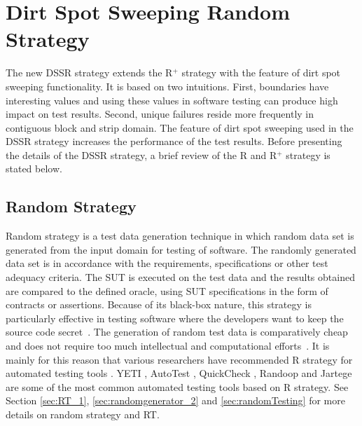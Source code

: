 
\section{Dirt Spot Sweeping Random Strategy}\label{sec:dssr}
The new DSSR strategy extends the R$^+$ strategy with the feature of dirt spot sweeping functionality. It is based on two intuitions. First, boundaries have interesting values and using these values in software testing can produce high impact on test results. Second, unique failures reside more frequently in contiguous block and strip domain. The feature of dirt spot sweeping used in the DSSR strategy increases the performance of the test results. Before presenting the details of the DSSR strategy, a brief review of the R and R$^+$ strategy is stated below.

\subsection{Random Strategy}
Random strategy is a test data generation technique in which random data set is generated from the input domain for testing of software. The randomly generated data set is in accordance with the requirements, specifications or other test adequacy criteria. The SUT is executed on the test data and the results obtained are compared to the defined oracle, using SUT specifications in the form of contracts or assertions. Because of its black-box nature, this strategy is particularly effective in testing software where the developers want to keep the source code secret~\cite{chen2010adaptive}. The generation of random test data is comparatively cheap and does not require too much intellectual and computational efforts~\cite{ciupa2008finding, ciupa2011number}. It is mainly for this reason that various researchers have recommended R strategy for automated testing tools \cite{ciupa2008artoo}.
 YETI \cite{oriol2010yeti}, AutoTest \cite{leitner2007reconciling, ciupa2007experimental}, QuickCheck \cite{claessen2011quickcheck}, Randoop \cite{pacheco2007feedback} and Jartege \cite{oriat2005jartege} are some of the most common automated testing tools based on R strategy. See Section \ref{sec:RT_1}, \ref{sec:randomgenerator_2} and \ref{sec:randomTesting} for more details on random strategy and RT.


